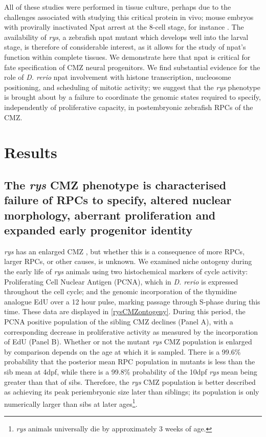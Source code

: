 All of these studies were performed in tissue culture, perhaps due to the challenges associated with studying this critical protein in vivo; mouse embryos with provirally inactivated Npat arrest at the 8-cell stage, for instance \cite{DiFruscio1997}. The availability of \textit{rys}, a zebrafish npat mutant which develops well into the larval stage, is therefore of considerable interest, as it allows for the study of npat’s function within complete tissues. We demonstrate here that npat is critical for fate specification of CMZ neural progenitors. We find substantial evidence for the role of \textit{D. rerio} npat involvement with histone transcription, nucleosome positioning, and scheduling of mitotic activity; we suggest that the \textit{rys} phenotype is brought about by a failure to coordinate the genomic states required to specify, independently of proliferative capacity, in postembryonic zebrafish RPCs of the CMZ.

\section{Results}
\subsection{The \textit{rys} CMZ phenotype is characterised failure of RPCs to specify, altered nuclear morphology, aberrant proliferation and expanded early progenitor identity}

\textit{rys} has an enlarged CMZ \cite{Wehman2005}, but whether this is a consequence of more RPCs, larger RPCs, or other causes, is unknown. We examined niche ontogeny during the early life of \textit{rys} animals using two histochemical markers of cycle activity: Proliferating Cell Nuclear Antigen (PCNA), which in \textit{D. rerio} is expressed throughout the cell cycle; and the genomic incorporation of the thymidine analogue EdU over a 12 hour pulse, marking passage through S-phase during this time. These data are displayed in \autoref{rysCMZontogeny}. During this period, the PCNA positive population of the sibling CMZ declines (Panel A), with a corresponding decrease in proliferative activity as measured by the incorporation of EdU (Panel B). Whether or not the mutant \textit{rys} CMZ population is enlarged by comparison depends on the age at which it is sampled. There is a 99.6\% probability that the posterior mean RPC population in mutants is less than the sib mean at 4dpf, while there is a 99.8\% probability of the 10dpf \textit{rys} mean being greater than that of sibs. Therefore, the \textit{rys} CMZ population is better described as achieving its peak periembryonic size later than siblings; its population is only numerically larger than sibs at later ages\footnote{\textit{rys} animals universally die by approximately 3 weeks of age.}. 

